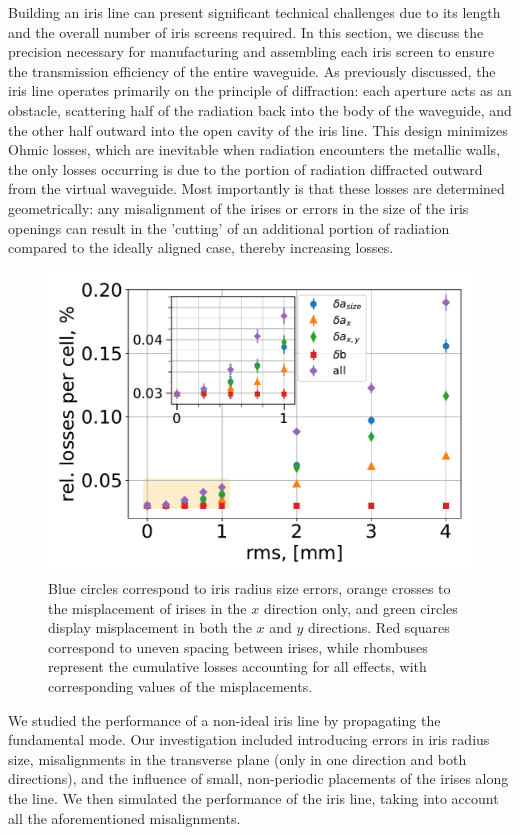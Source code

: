     Building an iris line can present significant technical challenges due to its length and the overall number of iris screens required. In this section, we discuss the precision necessary for manufacturing and assembling each iris screen to ensure the transmission efficiency of the entire waveguide. As previously discussed, the iris line operates primarily on the principle of diffraction: each aperture acts as an obstacle, scattering half of the radiation back into the body of the waveguide, and the other half outward into the open cavity of the iris line. This design minimizes Ohmic losses, which are inevitable when radiation encounters the metallic walls, the only losses occurring is due to the portion of radiation diffracted outward from the virtual waveguide. Most importantly is that these losses are determined geometrically: any misalignment of the irises or errors in the size of the iris openings can result in the 'cutting' of an additional portion of radiation compared to the ideally aligned case, thereby increasing losses.
    \begin{figure}[h!]
    	\centering
    		\includegraphics[trim={0 0cm 0 0cm}, width=0.55\linewidth]{content/images/transport/losses.pdf}
    		\centering
            \captionsetup{justification=centering}
            \caption{Blue circles correspond to iris radius size errors, orange crosses to the misplacement of irises in the $x$ direction only, and green circles display misplacement in both the $x$ and $y$ directions. Red squares correspond to uneven spacing between irises, while rhombuses represent the cumulative losses accounting for all effects, with corresponding values of the misplacements.}  
            \label{Fig:losses}
    \end{figure}
    
    We studied the performance of a non-ideal iris line by propagating the fundamental mode. Our investigation included introducing errors in iris radius size, misalignments in the transverse plane (only in one direction and both directions), and the influence of small, non-periodic placements of the irises along the line. We then simulated the performance of the iris line, taking into account all the aforementioned misalignments. 
    
